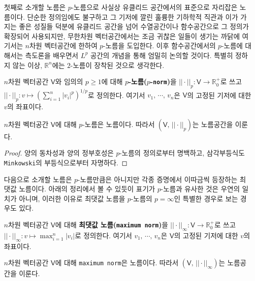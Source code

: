 첫째로 소개할 노름은 $p$-노름으로 사실상 유클리드 공간에서의 표준으로 자리잡은 노름이다. 단순한 정의임에도 불구하고 그 기저에 깔린 훌륭한 기하학적 직관과 이가 가지는 좋은 성질들 덕분에 유클리드 공간을 넘어 수열공간이나 함수공간으로 그 정의가 확장되어 사용되지만, 무한차원 벡터공간에서는 조금 귀찮은 일들이 생기는 까닭에 여기서는 $n$차원 벡터공간에 한하여 $p$-노름을 도입한다. 이후 함수공간에서의 $p$-노름에 대해서는 측도론을 배우면서 $L^p$ 공간의 개념을 통해 엄밀히 논의할 것이다. 특별히 정하지 않는 이상, $\mathbb{R}^n$에는 $2$-노름이 장착된 것으로 생각한다.

\begin{definition}
    $n$차원 벡터공간 $\mathsf{V}$와 임의의 $p\geq1$에 대해 \textbf{$p$-노름($p$-\texttt{norm})}을 $||\cdot||_p:\mathsf{V}\to\mathbb{R}_0^+$로 쓰고 $||\cdot||_p:v\mapsto(\sum_{i=1}^n|v_i|^p)^{1/p}$로 정의한다. 여기서 $v_1,\,\cdots,\,v_n$은 $\mathsf{V}$의 고정된 기저에 대한 $v$의 좌표이다.
\end{definition}

\begin{proposition}
    $n$차원 벡터공간 $\mathsf{V}$에 대해 $p$-노름은 노름이다. 따라서 $(\mathsf{V},\,||\cdot||_p)$는 노름공간을 이룬다.
\end{proposition}

\begin{proof}
    양의 동차성과 양의 정부호성은 $p$-노름의 정의로부터 명백하고, 삼각부등식도 \texttt{Minkowski}의 부등식으로부터 자명하다.
\end{proof}

다음으로 소개할 노름은 $p$-노름만큼은 아니지만 각종 증명에서 이따금씩 등장하는 최댓값 노름이다. 아래의 정리에서 볼 수 있듯이 표기가 $p$-노름과 유사한 것은 우연의 일치가 아니며, 이러한 이유로 최댓값 노름을 $p$-노름의 $p=\infty$인 특별한 경우로 보는 경우도 있다.

\begin{definition}
    $n$차원 벡터공간 $\mathsf{V}$에 대해 \textbf{최댓값 노름(\texttt{maximum norm})}을 $||\cdot||_\infty:\mathsf{V}\to\mathbb{R}_0^+$로 쓰고 $||\cdot||_\infty:v\mapsto\max_{i=1}^n|v_i|$로 정의한다. 여기서 $v_1,\,\cdots,\,v_n$은 $\mathsf{V}$의 고정된 기저에 대한 $v$의 좌표이다.
\end{definition}

\begin{proposition}
    $n$차원 벡터공간 $\mathsf{V}$에 대해 \texttt{maximum norm}은 노름이다. 따라서 $(\mathsf{V},\,||\cdot||_\infty)$는 노름공간을 이룬다.
\end{proposition}

